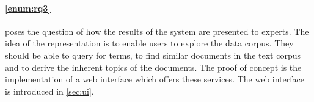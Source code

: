 \paragraph{\ref{enum:rq3}} poses the question of how the results of the system are presented to experts.
The idea of the representation is to enable users to explore the data corpus.
They should be able to query for terms,
to find similar documents in the text corpus and 
to derive the inherent topics of the documents.
The proof of concept is the implementation of a web interface which offers these services.
The web interface is introduced in \autoref{sec:ui}.